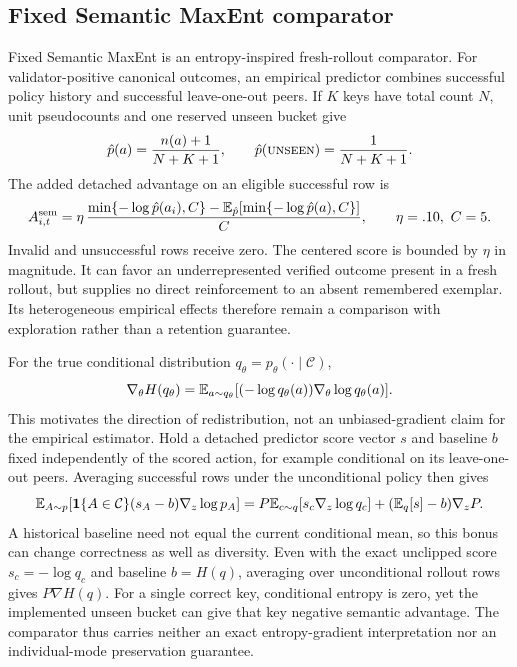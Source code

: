 \subsection{Fixed Semantic MaxEnt comparator}
\label{app:semantic-maxent}
\label{app:semantic-score}

Fixed Semantic MaxEnt is an entropy-inspired fresh-rollout comparator.
For validator-positive canonical outcomes, an empirical predictor combines
successful policy history and successful leave-one-out peers. If $K$ keys
have total count $N$, unit pseudocounts and one reserved unseen bucket give
\begin{equation}
  \hat p(a)=\frac{n(a)+1}{N+K+1},\qquad
  \hat p(\textsc{unseen})=\frac{1}{N+K+1}.
  \label{eq:open-set-predictor}
\end{equation}
The added detached advantage on an eligible successful row is
\begin{equation}
  A^{\rm sem}_{i,t}=\eta\,
  \frac{\min\{-\log\hat p(a_i),C\}
    -\mathbb E_{\hat p}[\min\{-\log\hat p(a),C\}]}{C},
  \qquad \eta=.10,\ C=5.
  \label{eq:legacy-semantic-advantage}
\end{equation}
\label{app:legacy-semantic-estimator}
\label{app:semantic-estimator}
Invalid and unsuccessful rows receive zero. The centered score is bounded
by $\eta$ in magnitude. It can favor an underrepresented verified outcome
present in a fresh rollout, but supplies no direct reinforcement to an
absent remembered exemplar. Its heterogeneous empirical effects therefore
remain a comparison with exploration rather than a retention guarantee.

For the true conditional distribution $q_\theta=p_\theta(\cdot\mid\mathcal C)$,
\begin{equation}
 \nabla_\theta H(q_\theta)
 =\mathbb E_{a\sim q_\theta}[(-\log q_\theta(a))\nabla_\theta\log q_\theta(a)].
 \label{eq:entropy-score-function}
\end{equation}
This motivates the direction of redistribution, not an unbiased-gradient
claim for the empirical estimator. Hold a detached predictor score vector
$s$ and baseline $b$ fixed independently of the scored action, for example
conditional on its leave-one-out peers. Averaging successful rows under the
unconditional policy then gives
\[
 \mathbb E_{A\sim p}[\mathbf 1\{A\in\mathcal C\}(s_A-b)\nabla_z\log p_A]
 =P\mathbb E_{c\sim q}[s_c\nabla_z\log q_c]
   +(\mathbb E_q[s]-b)\nabla_zP.
\]
A historical baseline need not equal the current conditional mean, so this
bonus can change correctness as well as diversity. Even with the exact
unclipped score $s_c=-\log q_c$ and baseline $b=H(q)$, averaging over
unconditional rollout rows gives $P\nabla H(q)$.
For a single correct key, conditional entropy is zero, yet the implemented
unseen bucket can give that key negative semantic advantage. The comparator
thus carries neither an exact entropy-gradient interpretation nor an
individual-mode preservation guarantee.

